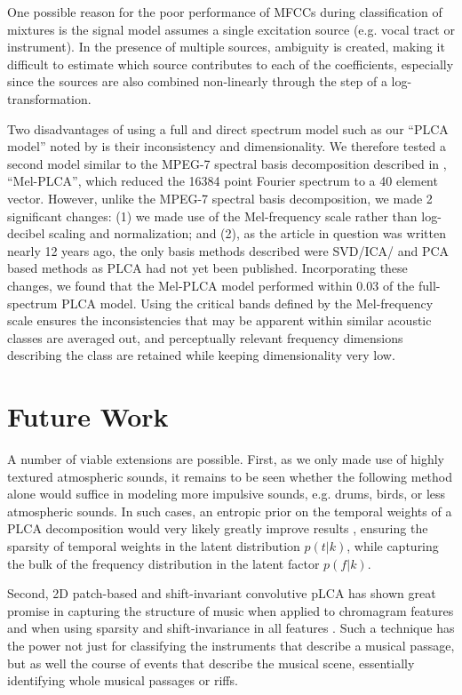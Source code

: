 \documentclass[a4paper,10pt,final]{ThesisStyle}
\begin{document}
One possible reason for the poor performance of MFCCs during classification of mixtures is the signal model assumes a single excitation source (e.g. vocal tract or instrument).  In the presence of multiple sources, ambiguity is created, making it difficult to estimate which source contributes to each of the coefficients, especially since the sources are also combined non-linearly through the step of a log-transformation. 

Two disadvantages of using a full and direct spectrum model such as our ``PLCA model'' noted by \cite{Casey2001a} is their inconsistency and dimensionality.  We therefore tested a second model similar to the MPEG-7 spectral basis decomposition described in  \cite{Casey2001a}, ``Mel-PLCA'', which reduced the 16384 point Fourier spectrum to a 40 element vector.  However, unlike the MPEG-7 spectral basis decomposition, we made 2 significant changes: (1) we made use of the Mel-frequency scale rather than log-decibel scaling and normalization; and (2), as the article in question was written nearly 12 years ago, the only basis methods described were SVD/ICA/ and PCA based methods as PLCA had not yet been published.  Incorporating these changes, we found that the Mel-PLCA model performed within 0.03 of the full-spectrum PLCA model.  Using the critical bands defined by the Mel-frequency scale ensures the inconsistencies that may be apparent within similar acoustic classes are averaged out, and perceptually relevant frequency dimensions describing the class are retained while keeping dimensionality very low.  

\section{Future Work}

A number of viable extensions are possible.  First, as we only made use of highly textured atmospheric sounds, it remains to be seen whether the following method alone would suffice in modeling more impulsive sounds, e.g. drums, birds, or less atmospheric sounds.  In such cases, an entropic prior on the temporal weights of a PLCA decomposition would very likely greatly improve results \cite{Smaragdis2007}, ensuring the sparsity of temporal weights in the latent distribution $p(t|k)$, while capturing the bulk of the frequency distribution in the latent factor $p(f|k)$. 

Second, 2D patch-based and shift-invariant convolutive pLCA \cite{Smaragdis2007} has shown great promise in capturing the structure of music when applied to chromagram features and when using sparsity and shift-invariance in all features \cite{Weiss2011}.  Such a technique has the power not just for classifying the instruments that describe a musical passage, but as well the course of events that describe the musical scene, essentially identifying whole musical passages or riffs.  
\end{document}
